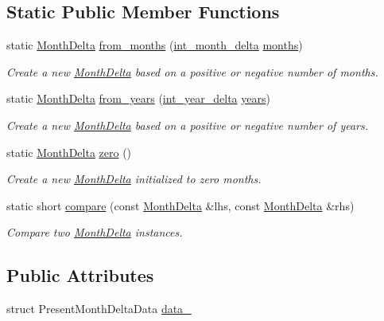 \subsection*{Static Public Member Functions}
\begin{DoxyCompactItemize}
\item 
static \hyperlink{structMonthDelta}{Month\-Delta} \hyperlink{structMonthDelta_a3174797cbae9e936d9b3d6c8ea425574}{from\-\_\-months} (\hyperlink{types_8h_adc711c00c117528b40875ad0119c687f}{int\-\_\-month\-\_\-delta} \hyperlink{structMonthDelta_a47f7592328f434f4091a5b044d83976a}{months})
\begin{DoxyCompactList}\small\item\em Create a new \hyperlink{structMonthDelta}{Month\-Delta} based on a positive or negative number of months. \end{DoxyCompactList}\item 
static \hyperlink{structMonthDelta}{Month\-Delta} \hyperlink{structMonthDelta_a163938a57f97fb289a1a0288f1429554}{from\-\_\-years} (\hyperlink{types_8h_ad2a6eecbd190f1ae0327acdeaf596623}{int\-\_\-year\-\_\-delta} \hyperlink{structMonthDelta_abd1a36332a0347d39a9a7b7befceb6f5}{years})
\begin{DoxyCompactList}\small\item\em Create a new \hyperlink{structMonthDelta}{Month\-Delta} based on a positive or negative number of years. \end{DoxyCompactList}\item 
static \hyperlink{structMonthDelta}{Month\-Delta} \hyperlink{structMonthDelta_a847cb9c956c133957dbaffb32fb9bd15}{zero} ()
\begin{DoxyCompactList}\small\item\em Create a new \hyperlink{structMonthDelta}{Month\-Delta} initialized to zero months. \end{DoxyCompactList}\item 
static short \hyperlink{structMonthDelta_a60b102be9cdf79b9eda0bb3a06e62178}{compare} (const \hyperlink{structMonthDelta}{Month\-Delta} \&lhs, const \hyperlink{structMonthDelta}{Month\-Delta} \&rhs)
\begin{DoxyCompactList}\small\item\em Compare two \hyperlink{structMonthDelta}{Month\-Delta} instances. \end{DoxyCompactList}\end{DoxyCompactItemize}
\subsection*{Public Attributes}
\begin{DoxyCompactItemize}
\item 
struct Present\-Month\-Delta\-Data \hyperlink{structMonthDelta_a428f2591ca57d192424b298f95c87978}{data\-\_\-}
\end{DoxyCompactItemize}
